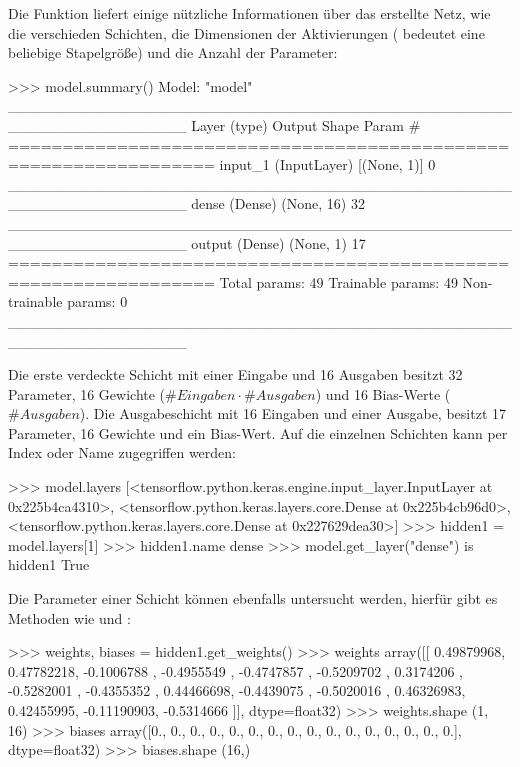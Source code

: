 Die  Funktion liefert einige nützliche Informationen
über das erstellte Netz, wie die verschieden Schichten, die Dimensionen
der Aktivierungen ( bedeutet eine beliebige Stapelgröße)
und die Anzahl der Parameter:
\begin{pyconcode}
>>> model.summary()
Model: "model"
_________________________________________________________________
Layer (type)                 Output Shape              Param #   
=================================================================
input_1 (InputLayer)         [(None, 1)]               0         
_________________________________________________________________
dense (Dense)                (None, 16)                32        
_________________________________________________________________
output (Dense)               (None, 1)                 17        
=================================================================
Total params: 49
Trainable params: 49
Non-trainable params: 0
_________________________________________________________________
\end{pyconcode}
Die erste verdeckte Schicht mit einer Eingabe und 16 Ausgaben besitzt
32 Parameter, 16 Gewichte ($\#Eingaben \cdot \#Ausgaben$) und 16 Bias-Werte ($\#Ausgaben$).
Die Ausgabeschicht mit 16 Eingaben und einer Ausgabe, besitzt
17 Parameter, 16 Gewichte und ein Bias-Wert.
Auf die einzelnen Schichten kann per Index oder Name zugegriffen werden:
\begin{pyconcode}
>>> model.layers
[<tensorflow.python.keras.engine.input_layer.InputLayer at 0x225b4ca4310>,
 <tensorflow.python.keras.layers.core.Dense at 0x225b4cb96d0>,
 <tensorflow.python.keras.layers.core.Dense at 0x227629dea30>]
>>> hidden1 = model.layers[1]
>>> hidden1.name
dense
>>> model.get_layer("dense") is hidden1
True
\end{pyconcode}
Die Parameter einer Schicht können ebenfalls untersucht werden,
hierfür gibt es Methoden wie
 und :
\begin{pyconcode}
>>> weights, biases = hidden1.get_weights()
>>> weights
array([[ 0.49879968,  0.47782218, -0.1006788 , -0.4955549 , -0.4747857 ,
        -0.5209702 ,  0.3174206 , -0.5282001 , -0.4355352 ,  0.44466698,
        -0.4439075 , -0.5020016 ,  0.46326983,  0.42455995, -0.11190903,
        -0.5314666 ]], dtype=float32)
>>> weights.shape
(1, 16)
>>> biases
array([0., 0., 0., 0., 0., 0., 0., 0., 0., 0., 0., 0., 0., 0., 0., 0.],
      dtype=float32)
>>> biases.shape
(16,)
\end{pyconcode}

